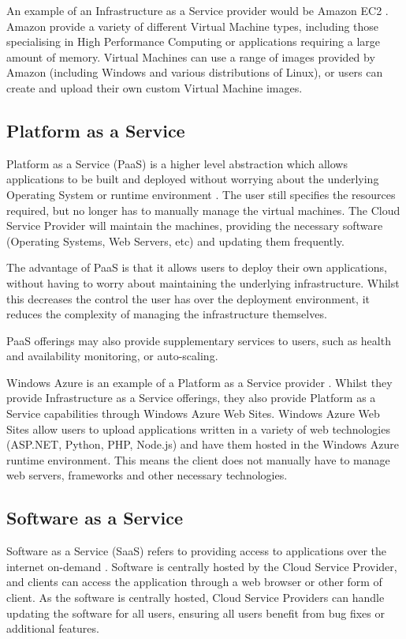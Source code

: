 An example of an Infrastructure as a Service provider would be Amazon EC2 \cite{amazonEC2}. Amazon provide a variety of different Virtual Machine types, including those specialising in High Performance Computing or applications requiring a large amount of memory. Virtual Machines can use a range of images provided by Amazon (including Windows and various distributions of Linux), or users can create and upload their own custom Virtual Machine images. 

\subsection{Platform as a Service}
Platform as a Service (PaaS) is a higher level abstraction which allows applications to be built and deployed without worrying about the underlying Operating System or runtime environment \cite{intelPaaS}. The user still specifies the resources required, but no longer has to manually manage the virtual machines. The Cloud Service Provider will maintain the machines, providing the necessary software (Operating Systems, Web Servers, etc) and updating them frequently.

The advantage of PaaS is that it allows users to deploy their own applications, without having to worry about maintaining the underlying infrastructure. Whilst this decreases the control the user has over the deployment environment, it reduces the complexity of managing the infrastructure themselves. 

PaaS offerings may also provide supplementary services to users, such as health and availability monitoring, or auto-scaling.

Windows Azure is an example of a Platform as a Service provider \cite{azure}. Whilst they provide Infrastructure as a Service offerings, they also provide Platform as a Service capabilities through Windows Azure Web Sites. Windows Azure Web Sites allow users to upload applications written in a variety of web technologies (ASP.NET, Python, PHP, Node.js) and have them hosted in the Windows Azure runtime environment. This means the client does not manually have to manage web servers, frameworks and other necessary technologies.

\subsection{Software as a Service}
Software as a Service (SaaS) refers to providing access to applications over the internet on-demand \cite{zhang2010cloud}. Software is centrally hosted by the Cloud Service Provider, and clients can access the application through a web browser or other form of client. As the software is centrally hosted, Cloud Service Providers can handle updating the software for all users, ensuring all users benefit from bug fixes or additional features. 

